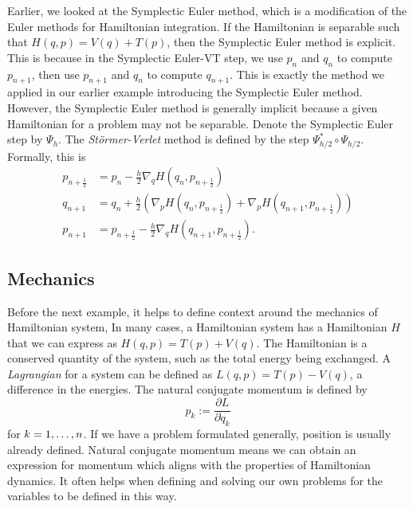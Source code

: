 \documentclass{report}
\theoremstyle{exampstyle} \newtheorem{example}[theorem]{Example}
\theoremstyle{exampstyle} \newtheorem{remark}[theorem]{Remark}
\theoremstyle{exampstyle} \newtheorem{definition}[theorem]{Definition}
\theoremstyle{exampstyle} \newtheorem{lemma}[theorem]{Lemma}
\theoremstyle{exampstyle} \newtheorem{proposition}[theorem]{Proposition}
\begin{document}
Earlier, we looked at the Symplectic Euler method, which is a modification of the Euler methods for Hamiltonian integration.
If the Hamiltonian is separable such that $H(q,p) = V(q) + T(p)$, then the Symplectic Euler method is explicit.
This is because in the Symplectic Euler-VT step, we use $p_n$ and $q_n$ to compute $p_{n+1}$, then use $p_{n+1}$ and $q_n$ to compute $q_{n+1}$.
This is exactly the method we applied in our earlier example introducing the Symplectic Euler method.
However, the Symplectic Euler method is generally implicit because a given Hamiltonian for a problem may not be separable.
Denote the Symplectic Euler step by $\Psi_h$. The \textit{St\"ormer-Verlet} method is defined by the step $\Psi_{h/2}^* \circ \Psi_{h/2}$.
Formally, this is
\begin{align*}
	p_{n+\frac{1}{2}} &= p_n - \frac{h}{2}\nabla_q H \left( q_n, p_{n+\frac{1}{2}} \right) \\
	q_{n+1} &= q_n + \frac{h}{2}\left( \nabla_p H \left( q_n, p_{n+\frac{1}{2}} \right) + \nabla_p H \left(q_{n+1}, p_{n+\frac{1}{2}} \right) \right) \\
	p_{n+1} &= p_{n+\frac{1}{2}} - \frac{h}{2} \nabla_q H \left( q_{n+1}, p_{n+\frac{1}{2}} \right).
\end{align*}

\subsection{Mechanics}

Before the next example, it helps to define context around the mechanics of Hamiltonian system,
In many cases, a Hamiltonian system has a Hamiltonian $H$ that we can express as $H(q,p) = T(p) + V(q)$.
The Hamiltonian is a conserved quantity of the system, such as the total energy being exchanged.
A \textit{Lagrangian} for a system can be defined as $L(q,p) = T(p) - V(q)$,
a difference in the energies.
The natural conjugate momentum is defined by
\begin{equation}
	p_k := \dfrac{\partial L}{\partial \dot{q}_k}
\end{equation}
for $k = 1,\mathellipsis,n$.
If we have a problem formulated generally, position is usually already defined.
Natural conjugate momentum means we can obtain an expression for momentum which aligns with the properties of Hamiltonian dynamics.
It often helps when defining and solving our own problems for the variables to be defined in this way.
\end{document}

